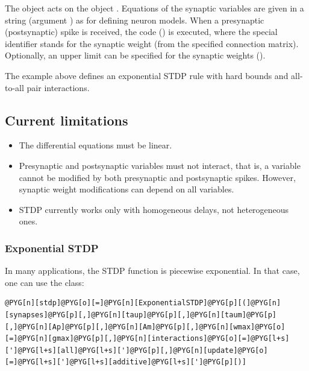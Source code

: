 \documentclass[letterpaper,10pt,english]{manual}
\begin{document}
The \hyperlink{brian.STDP}{} object acts on the \hyperlink{brian.Connection}{} object
. Equations of the synaptic variables are given in
a string (argument ) as for defining neuron models.
When a presynaptic (postsynaptic) spike is received, the code
 () is executed, where the special identifier
 stands for the synaptic weight (from the specified
connection matrix). Optionally, an upper limit can be specified
for the synaptic weights ().

The example above defines an exponential STDP rule with hard bounds
and all-to-all pair interactions.


\subsection{Current limitations}
\begin{itemize}
\item {} 
The differential equations must be linear.

\item {} 
Presynaptic and postsynaptic variables must not interact, that is,
a variable cannot be modified by both presynaptic and postsynaptic
spikes. However, synaptic weight modifications can depend on all variables.

\item {} 
STDP currently works only with homogeneous delays, not heterogeneous ones.

\end{itemize}


\subsubsection{Exponential STDP}

In many applications, the STDP function is piecewise exponential.
In that case, one can use the \hyperlink{brian.ExponentialSTDP}{} class:

\begin{Verbatim}[commandchars=@\[\]]
@PYG[n][stdp]@PYG[o][=]@PYG[n][ExponentialSTDP]@PYG[p][(]@PYG[n][synapses]@PYG[p][,]@PYG[n][taup]@PYG[p][,]@PYG[n][taum]@PYG[p][,]@PYG[n][Ap]@PYG[p][,]@PYG[n][Am]@PYG[p][,]@PYG[n][wmax]@PYG[o][=]@PYG[n][gmax]@PYG[p][,]@PYG[n][interactions]@PYG[o][=]@PYG[l+s][']@PYG[l+s][all]@PYG[l+s][']@PYG[p][,]@PYG[n][update]@PYG[o][=]@PYG[l+s][']@PYG[l+s][additive]@PYG[l+s][']@PYG[p][)]
\end{Verbatim}
\end{document}
